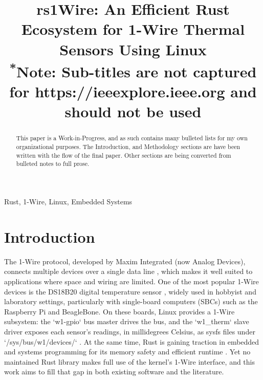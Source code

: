 \documentclass[conference]{IEEEtran}
\begin{document}
\title{rs1Wire: An Efficient Rust Ecosystem for 1-Wire Thermal Sensors Using Linux\\
{\footnotesize \textsuperscript{*}Note: Sub-titles are not captured for https://ieeexplore.ieee.org  and
should not be used}
}

\author{
\and
{}
}

\maketitle

\begin{abstract}

This paper is a Work-in-Progress, and as such contains many bulleted lists for my own organizational purposes.
The Introduction, and Methodology sections are have been written with the flow of the final paper.
Other sections are being converted from bulleted notes to full prose.

\end{abstract}

\begin{IEEEkeywords}
Rust, 1-Wire, Linux, Embedded Systems
\end{IEEEkeywords}

\section{Introduction}

The 1-Wire protocol, developed by Maxim Integrated (now Analog Devices), connects multiple devices over a single data line \cite{Analog_Devices_1w}, which makes it well suited to applications where space and wiring are limited.
One of the most popular 1-Wire devices is the DS18B20 digital temperature sensor \cite{ds18b20_datasheet}, widely used in hobbyist and laboratory settings, particularly with single-board computers (SBCs) such as the Raspberry Pi and BeagleBone.
On these boards, Linux provides a 1-Wire subsystem: the `w1-gpio` bus master drives the bus, and the `w1\_therm` slave driver exposes each sensor's readings, in millidegrees Celsius, as sysfs files under `/sys/bus/w1/devices/` \cite{kernel_w1_therm_docs}.
At the same time, Rust is gaining traction in embedded and systems programming for its memory safety and efficient runtime \cite{sharma2024rust}.
Yet no maintained Rust library makes full use of the kernel's 1-Wire interface, and this work aims to fill that gap in both existing software and the literature.
\end{document}
